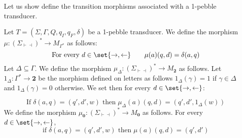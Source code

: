 Let us show define the transition morphisms associated with a 1-pebble transducer.
\begin{definition}
Let $T=(\Sigma, \Gamma, Q, q_I, q_F, \delta)$ be a 1-pebble transducer. 
We define the morphism $\mu:(\Sigma_{\vdash\dashv})^*\to M_{\Gamma^*}$ as follows:
$$\text{For every } d\in \set{\rightarrow,\leftarrow}\qquad\mu(a)(q,d)=\delta(a,q)$$
Let $\Delta\subseteq \Gamma$. We define the morphism $\mu_\Delta:(\Sigma_{\vdash\dashv})^*\to M_{\mathbf 2}$ as follows. Let $1_\Delta:\Gamma^*\to \mathbf{2}$ be the morphism defined on letters as follows $1_\Delta(\gamma)=1$ if $\gamma\in \Delta$ and $1_\Delta(\gamma)=0$ otherwise. We set then for every $d\in\set{\rightarrow,\leftarrow}$: 

$$\text{If } \delta(a,q)=(q',d',w) \text{ then } \mu_\Delta(a)(q,d)=(q',d',1_\Delta(w))$$
We define the morphism $\mu_{\mathbf{0}}:(\Sigma_{\vdash\dashv})^*\to M_{\mathbf 0}$ as follows. For every $d\in\set{\rightarrow,\leftarrow}$,
$$\text{if } \delta(a,q)=(q',d',w) \text{ then }  \mu(a)(q,d)=(q',d') $$
\end{definition} 

